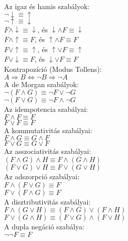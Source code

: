\begin{frame}

\begin{tcolorbox}[title={Ekvivalens formulák}]
Az igaz és hamis szabályok:\\
${\neg}\downarrow \equiv \uparrow$\\
${\neg}\uparrow \equiv \downarrow$\\
$F \land \downarrow \equiv \downarrow$, és $\downarrow \land F \equiv \downarrow$\\
$F \land \uparrow \equiv F$, és $\uparrow \land F \equiv F$\\
$F \lor \uparrow \equiv \uparrow$, és $\uparrow \lor F \equiv \uparrow$\\
$F \lor \downarrow \equiv F$, és $\downarrow \lor F \equiv F$\\
\mmedskip
Kontrapozíció (Modus Tollens):\\
$A \Rightarrow B \iff {\neg}B \Rightarrow {\neg}A$\\
\mmedskip
A de Morgan szabályok:\\
${\neg}(F \land G) \equiv {\neg}F \lor {\neg}G$\\
${\neg}(F \lor G) \equiv {\neg}F \land {\neg}G$\\
\mmedskip
Az idempotencia szabályai:\\
$F \land F \equiv F$\\
$F \lor F \equiv F$\\
\mmedskip
A kommutativitás szabályai:\\
$F \land G \equiv G \land F$\\
$F \lor G \equiv G \lor F$\\
\mmedskip
Az asszociativitás szabályai:\\
$(F \land G) \land H \equiv F \land (G \land H)$\\
$(F \lor G) \lor H \equiv F \lor (G \lor H)$\\
\mmedskip
Az adszorpció szabályai:\\
$F \land (F \lor G) \equiv F$\\
$F \lor (F \land G) \equiv F$\\
\mmedskip
A disztributivitás szabályai:\\
$F \land (G \lor H) \equiv (F \land G) \lor (F \land H)$\\
$F \lor (G \land H) \equiv (F \lor G) \land (F \lor H)$\\
\mmedskip
A dupla negáció szabálya:\\
${\neg}{\neg}F \equiv F$
\end{tcolorbox}

\end{frame}


